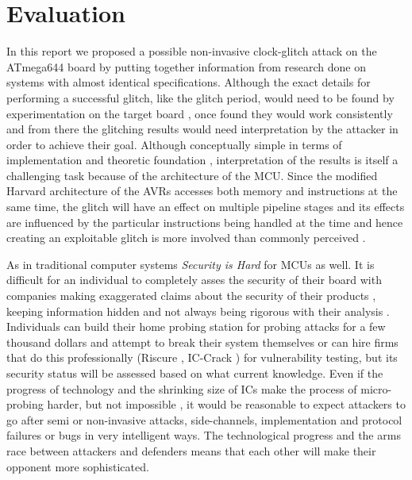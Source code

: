 \section{Evaluation}
\label{sec:conclusion}
In this report we proposed a possible non-invasive clock-glitch attack on the ATmega644 board by putting together information from research done on systems with almost identical specifications. Although the exact details for performing a successful glitch, like the glitch period, would need to be found by experimentation on the target board \citep{glitches_paper}, once found they would work consistently \citep{glitches_paper} and from there the glitching results would need interpretation by the attacker in order to achieve their goal. Although conceptually simple in terms of implementation and theoretic foundation \citep{sergei:thesis} \citep{glitches_paper}, interpretation of the results is itself a challenging task \citep{glitches_paper} because of the architecture of the MCU. Since the modified Harvard architecture of the AVRs accesses both memory and instructions at the same time, the glitch will have an effect on multiple pipeline stages and its effects are influenced by the particular instructions being handled at the time and hence creating an exploitable glitch is more involved than commonly perceived \citep{glitches_paper}. 

As in traditional computer systems \emph{Security is Hard} for MCUs as well. It is difficult for an individual to completely asses the security of their board with companies making exaggerated claims about the security of their products \citep{sergei:thesis}, keeping information hidden and not always being rigorous with their analysis \citep{sergei:thesis}. Individuals can build their home probing station for probing attacks for a few thousand dollars \citep{sergei:thesis} \citep{low_cost_probing} and attempt to break their system themselves or can hire firms that do this professionally (Riscure \citep{website:riscure}, {IC-Crack} \citep{atmel_mcu_crack}) for vulnerability testing, but its security status will be assessed based on what current knowledge. Even if the progress of technology and the shrinking size of ICs make the process of micro-probing harder, but not impossible \citep{sergei:thesis}, it would be reasonable to expect attackers to go after semi or non-invasive attacks, side-channels, implementation and protocol failures or bugs in very intelligent ways. The technological progress and the arms race between attackers and defenders means that each other will make their opponent more sophisticated.

